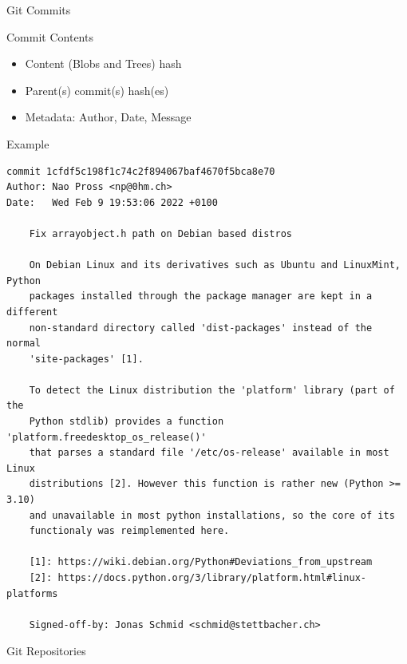 \documentclass[xetex, handout]{beamer}
\begin{document}
\begin{frame}[fragile]{Git Commits}
  \begin{block}{Commit Contents}
    \begin{itemize}
      \item Content (Blobs and Trees) hash 
      \item Parent(s) commit(s) hash(es)
      \item Metadata: Author, Date, Message
    \end{itemize}
  \end{block}
  \begin{exampleblock}{Example}
  \centering\scriptsize
\begin{verbatim}
commit 1cfdf5c198f1c74c2f894067baf4670f5bca8e70
Author: Nao Pross <np@0hm.ch>
Date:   Wed Feb 9 19:53:06 2022 +0100

    Fix arrayobject.h path on Debian based distros
    
    On Debian Linux and its derivatives such as Ubuntu and LinuxMint, Python
    packages installed through the package manager are kept in a different
    non-standard directory called 'dist-packages' instead of the normal
    'site-packages' [1].
    
    To detect the Linux distribution the 'platform' library (part of the
    Python stdlib) provides a function 'platform.freedesktop_os_release()'
    that parses a standard file '/etc/os-release' available in most Linux
    distributions [2]. However this function is rather new (Python >= 3.10)
    and unavailable in most python installations, so the core of its
    functionaly was reimplemented here.
    
    [1]: https://wiki.debian.org/Python#Deviations_from_upstream
    [2]: https://docs.python.org/3/library/platform.html#linux-platforms
    
    Signed-off-by: Jonas Schmid <schmid@stettbacher.ch>
\end{verbatim}
  \end{exampleblock}
\end{frame}

\begin{frame}{Git Repositories}
\end{frame}
\end{document}
